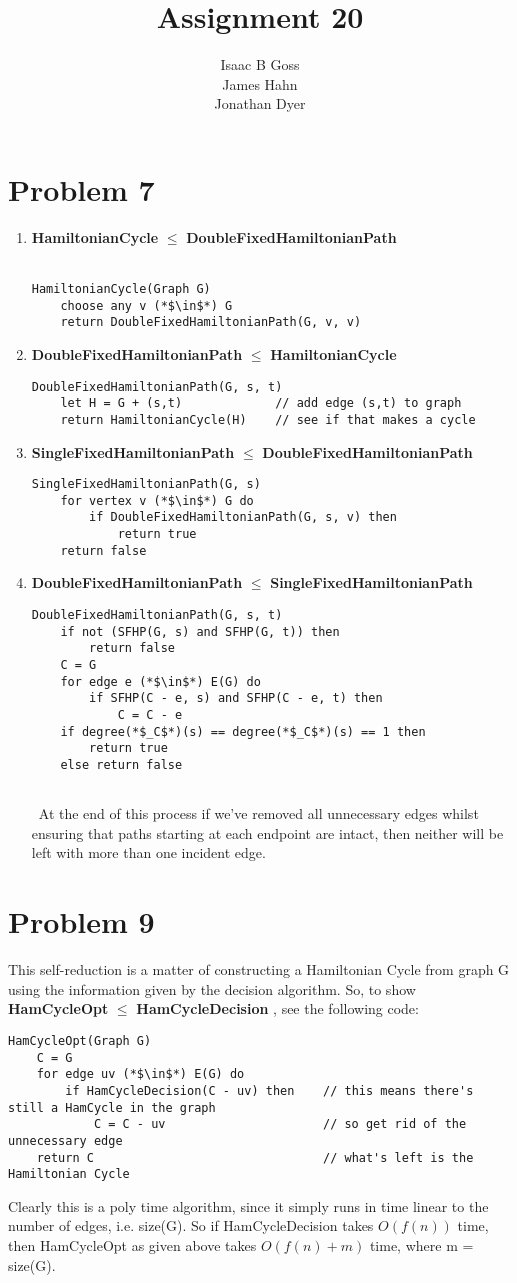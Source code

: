 \documentclass{article}
\author{Isaac B Goss\\ James Hahn\\ Jonathan Dyer}
\title{Assignment 20}
\providecommand{\prob}[1]{\section*{Problem #1}}
\providecommand{\reducible}[2]{
  \textbf{#1} $\leq$ \textbf{#2}
}
\begin{document}
\maketitle
\prob{7}
\begin{enumerate}
  \item \reducible{HamiltonianCycle}{DoubleFixedHamiltonianPath} \\
  \begin{lstlisting}
HamiltonianCycle(Graph G)
    choose any v (*$\in$*) G
    return DoubleFixedHamiltonianPath(G, v, v)
  \end{lstlisting}

  \item \reducible{DoubleFixedHamiltonianPath}{HamiltonianCycle}
  \begin{lstlisting}
DoubleFixedHamiltonianPath(G, s, t)
    let H = G + (s,t)             // add edge (s,t) to graph
    return HamiltonianCycle(H)    // see if that makes a cycle
  \end{lstlisting}

  \item \reducible{SingleFixedHamiltonianPath}{DoubleFixedHamiltonianPath}
  \begin{lstlisting}
SingleFixedHamiltonianPath(G, s)
    for vertex v (*$\in$*) G do
        if DoubleFixedHamiltonianPath(G, s, v) then
            return true
    return false
  \end{lstlisting}

  \item \reducible{DoubleFixedHamiltonianPath}{SingleFixedHamiltonianPath}
  \begin{lstlisting}
DoubleFixedHamiltonianPath(G, s, t)
    if not (SFHP(G, s) and SFHP(G, t)) then
        return false
    C = G
    for edge e (*$\in$*) E(G) do
        if SFHP(C - e, s) and SFHP(C - e, t) then
            C = C - e
    if degree(*$_C$*)(s) == degree(*$_C$*)(s) == 1 then
        return true
    else return false
  \end{lstlisting}
  At the end of this process if we've removed all unnecessary edges whilst ensuring that paths starting at each endpoint are
  intact, then neither will be left with more than one incident edge. 
\end{enumerate}

\prob{9}
This self-reduction is a matter of constructing a Hamiltonian Cycle from graph G using the information given by the decision algorithm.
So, to show \reducible{HamCycleOpt}{HamCycleDecision}, see the following code:
\begin{lstlisting}
HamCycleOpt(Graph G)
    C = G
    for edge uv (*$\in$*) E(G) do
        if HamCycleDecision(C - uv) then    // this means there's still a HamCycle in the graph
            C = C - uv                      // so get rid of the unnecessary edge
    return C                                // what's left is the Hamiltonian Cycle
\end{lstlisting}
Clearly this is a poly time algorithm, since it simply runs in time linear to the number of edges, i.e. size(G). So if HamCycleDecision takes $O(f(n))$ time, then HamCycleOpt as given above takes $O(f(n) + m)$ time, where m = size(G).
\end{document}
